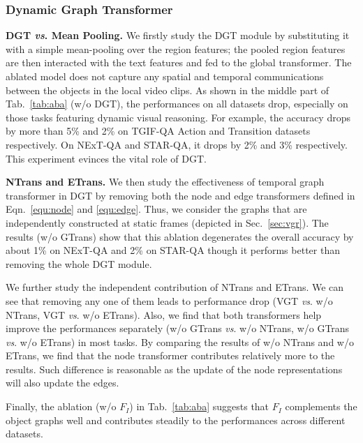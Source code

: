 \documentclass[10pt,journal,compsoc]{IEEEtran}
\newcommand{\vs}{\textit{vs}. }
\begin{document}
\subsubsection{Dynamic Graph Transformer}
\textbf{DGT \vs Mean Pooling.} We firstly study the DGT module by substituting it with a simple mean-pooling over the region features; the pooled region features are then interacted with the text features and fed to the global transformer. The ablated model does not capture any spatial and temporal communications between the objects in the local video clips. As shown in the middle part of Tab.~\ref{tab:aba} (w/o DGT), the performances on all datasets drop, especially on those tasks featuring dynamic visual reasoning. For example, the accuracy drops by more than 5\% and 2\% on TGIF-QA Action and Transition datasets respectively. On NExT-QA and STAR-QA, it drops by 2\% and 3\% respectively. This experiment evinces the vital role of DGT.

\textbf{NTrans and ETrans.} We then study the effectiveness of temporal graph transformer in DGT by removing both the node and edge transformers defined in Eqn.~\eqref{equ:node} and \eqref{equ:edge}. Thus, we consider the graphs that are independently constructed at static frames (depicted in Sec.~\ref{sec:vgr}). The results (w/o GTrans) show that this ablation degenerates the overall accuracy by about 1\% on NExT-QA and 2\% on STAR-QA though it performs better than removing the whole DGT module. 

We further study the independent contribution of NTrans and ETrans. We can see that removing any one of them leads to performance drop (VGT \vs w/o NTrans, VGT \vs w/o ETrans). Also, we find that both transformers help improve the performances separately (w/o GTrans \vs w/o NTrans, w/o GTrans \vs w/o ETrans) in most tasks. By comparing the results of w/o NTrans and w/o ETrans, we find that the node transformer contributes relatively more to the results. Such difference is reasonable as the update of the node representations will also update the edges.

Finally, the ablation (w/o $F_I$) in Tab.~\ref{tab:aba} suggests that $F_I$ complements the object graphs well and contributes steadily to the performances across different datasets. 
\end{document}
